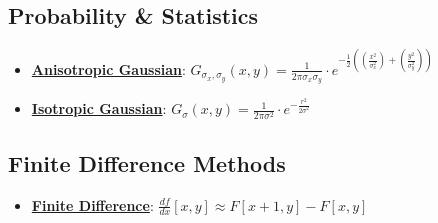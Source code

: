 \documentclass{article}%
\begin{document}
%
\subsection{Probability \& Statistics}%
\label{subsec:ProbabilityStatistics}%
\begin{itemize}[leftmargin=*]%
\item \href{https://purdue.brightspace.com/d2l/common/assets/pdfjs-d2l-dist/1.0.14-legacy/web/viewer.html?file=\%2Fcontent\%2Fenforced\%2F1095467-wl.202510.CS.24300.001\%2F08L2-Feature Extraction.pdf\%3Fou\%3D1095467\&lang=en-us\&container=d2l-fileviewer-rendered-pdf\&fullscreen=d2l-fileviewer-rendered-pdf-dialog\&height=667#page=43}{\textbf{Anisotropic Gaussian}}: $G_{\sigma_x, \sigma_y}(x, y) = \frac{1}{2\pi\sigma_x\sigma_y} \cdot e^{-\frac{1}{2}((\frac{x^2}{\sigma_x^2}) + (\frac{y^2}{\sigma_y^2}))}$%
\item \href{https://purdue.brightspace.com/d2l/common/assets/pdfjs-d2l-dist/1.0.14-legacy/web/viewer.html?file=\%2Fcontent\%2Fenforced\%2F1095467-wl.202510.CS.24300.001\%2F08L2-Feature Extraction.pdf\%3Fou\%3D1095467\&lang=en-us\&container=d2l-fileviewer-rendered-pdf\&fullscreen=d2l-fileviewer-rendered-pdf-dialog\&height=667#page=43}{\textbf{Isotropic Gaussian}}: $G_\sigma(x, y) = \frac{1}{2\pi\sigma^2} \cdot e^{-\frac{r^2}{2\sigma^2}}$%
\end{itemize}

%
\subsection{Finite Difference Methods}%
\label{subsec:FiniteDifferenceMethods}%
\begin{itemize}[leftmargin=*]%
\item \href{https://purdue.brightspace.com/d2l/common/assets/pdfjs-d2l-dist/1.0.14-legacy/web/viewer.html?file=\%2Fcontent\%2Fenforced\%2F1095467-wl.202510.CS.24300.001\%2F08L2-Feature Extraction.pdf\%3Fou\%3D1095467\&lang=en-us\&container=d2l-fileviewer-rendered-pdf\&fullscreen=d2l-fileviewer-rendered-pdf-dialog\&height=667#page=15}{\textbf{Finite Difference}}: $\frac{df}{dx} [x, y] \approx F[x + 1, y] - F[x, y]$%
\end{itemize}

%
\end{document}
